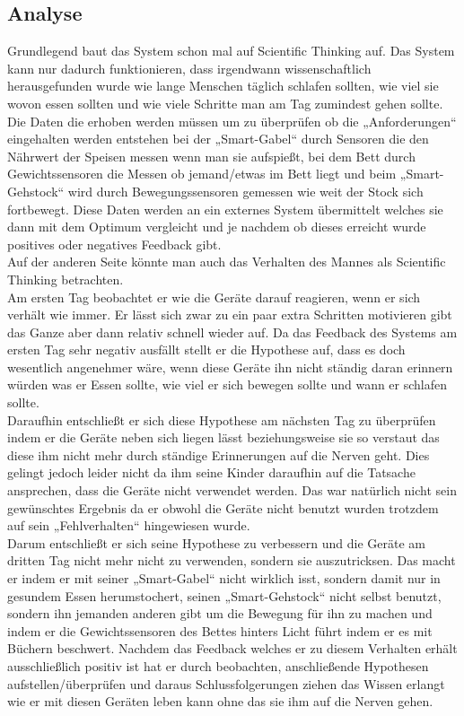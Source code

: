 \subsection{Analyse}
Grundlegend baut das System \cite{uninvatedGuests} schon mal auf Scientific Thinking auf. Das System kann nur dadurch funktionieren, dass irgendwann wissenschaftlich herausgefunden wurde wie lange Menschen täglich schlafen sollten, wie viel sie wovon essen sollten und wie viele Schritte man am Tag zumindest gehen sollte. Die Daten die erhoben werden müssen um zu überprüfen ob die „Anforderungen“ eingehalten werden entstehen bei der „Smart-Gabel“ durch Sensoren die den Nährwert der Speisen messen wenn man sie aufspießt, bei dem Bett durch Gewichtssensoren die Messen ob jemand/etwas im Bett liegt und beim „Smart-Gehstock“ wird durch Bewegungssensoren gemessen wie weit der Stock sich fortbewegt. Diese Daten werden an ein externes System übermittelt welches sie dann mit dem Optimum vergleicht und je nachdem ob dieses erreicht wurde positives oder negatives Feedback gibt. \\
Auf der anderen Seite könnte man auch das Verhalten des Mannes als Scientific Thinking betrachten.  \\
Am ersten Tag beobachtet er wie die Geräte darauf reagieren, wenn er sich verhält wie immer. Er lässt sich zwar zu ein paar extra Schritten motivieren gibt das Ganze aber dann relativ schnell wieder auf. Da das Feedback des Systems am ersten Tag sehr negativ ausfällt stellt er die Hypothese auf, dass es doch wesentlich angenehmer wäre, wenn diese Geräte ihn nicht ständig daran erinnern würden was er Essen sollte, wie viel er sich bewegen sollte und wann er schlafen sollte.  \\
Daraufhin entschließt er sich diese Hypothese am nächsten Tag zu überprüfen indem er die Geräte neben sich liegen lässt beziehungsweise sie so verstaut das diese ihm nicht mehr durch ständige Erinnerungen auf die Nerven geht. Dies gelingt jedoch leider nicht da ihm seine Kinder daraufhin auf die Tatsache ansprechen, dass die Geräte nicht verwendet werden. Das war natürlich nicht sein gewünschtes Ergebnis da er obwohl die Geräte nicht benutzt wurden trotzdem auf sein „Fehlverhalten“ hingewiesen wurde.  \\
Darum entschließt er sich seine Hypothese zu verbessern und die Geräte am dritten Tag nicht mehr nicht zu verwenden, sondern sie auszutricksen. Das macht er indem er mit seiner „Smart-Gabel“ nicht wirklich isst, sondern damit nur in gesundem Essen herumstochert, seinen „Smart-Gehstock“ nicht selbst benutzt, sondern ihn jemanden anderen gibt um die Bewegung für ihn zu machen und indem er die Gewichtssensoren des Bettes hinters Licht führt indem er es mit Büchern beschwert. 
Nachdem das Feedback welches er zu diesem Verhalten erhält ausschließlich positiv ist hat er durch beobachten, anschließende Hypothesen aufstellen/überprüfen und daraus Schlussfolgerungen ziehen das Wissen erlangt wie er mit diesen Geräten leben kann ohne das sie ihm auf die Nerven gehen.  

